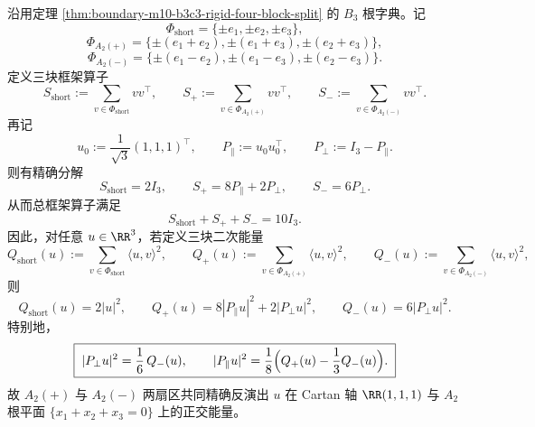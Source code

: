 \begin{theorem}\label{thm:xi-horizon-b3-sector-frame-decomposition}
沿用定理 \ref{thm:boundary-m10-b3c3-rigid-four-block-split} 的 \(B_3\) 根字典。记
\[
\Phi_{\mathrm{short}}=\{\pm e_1,\pm e_2,\pm e_3\},
\]
\[
\Phi_{A_2(+)}=\{\pm(e_1+e_2),\pm(e_1+e_3),\pm(e_2+e_3)\},
\]
\[
\Phi_{A_2(-)}=\{\pm(e_1-e_2),\pm(e_1-e_3),\pm(e_2-e_3)\}.
\]
定义三块框架算子
\[
S_{\mathrm{short}}:=\sum_{v\in\Phi_{\mathrm{short}}}vv^\top,
\qquad
S_{+}:=\sum_{v\in\Phi_{A_2(+)}}vv^\top,
\qquad
S_{-}:=\sum_{v\in\Phi_{A_2(-)}}vv^\top.
\]
再记
\[
u_0:=\frac1{\sqrt3}(1,1,1)^\top,
\qquad
P_{\parallel}:=u_0u_0^\top,
\qquad
P_{\perp}:=I_3-P_{\parallel}.
\]
则有精确分解
\[
\boxed{\;
S_{\mathrm{short}}=2I_3,\qquad
S_{+}=8P_{\parallel}+2P_{\perp},\qquad
S_{-}=6P_{\perp}.
\;}
\]
从而总框架算子满足
\[
\boxed{\;
S_{\mathrm{short}}+S_{+}+S_{-}=10I_3.
\;}
\]
因此，对任意 \(u\in\RR^3\)，若定义三块二次能量
\[
Q_{\mathrm{short}}(u):=\sum_{v\in\Phi_{\mathrm{short}}}\langle u,v\rangle^2,
\qquad
Q_{+}(u):=\sum_{v\in\Phi_{A_2(+)}}\langle u,v\rangle^2,
\qquad
Q_{-}(u):=\sum_{v\in\Phi_{A_2(-)}}\langle u,v\rangle^2,
\]
则
\[
Q_{\mathrm{short}}(u)=2|u|^2,
\qquad
Q_{+}(u)=8|P_{\parallel}u|^2+2|P_{\perp}u|^2,
\qquad
Q_{-}(u)=6|P_{\perp}u|^2.
\]
特别地，
\[
\boxed{\;
|P_{\perp}u|^2=\frac16\,Q_{-}(u),\qquad
|P_{\parallel}u|^2=\frac18\Bigl(Q_{+}(u)-\frac13Q_{-}(u)\Bigr).
\;}
\]
故 \(A_2(+)\) 与 \(A_2(-)\) 两扇区共同精确反演出 \(u\) 在 Cartan 轴 \(\RR(1,1,1)\) 与 \(A_2\) 根平面 \(\{x_1+x_2+x_3=0\}\) 上的正交能量。
\end{theorem}
